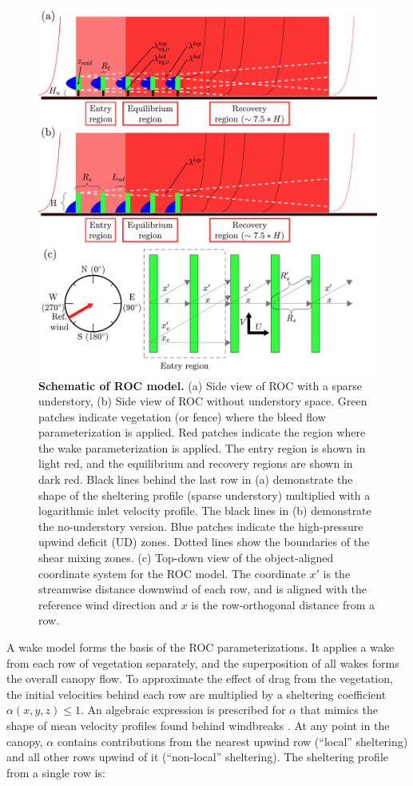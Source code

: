\begin{figure}[H]\label{fig:ROCmodel}
\includegraphics[width=17cm]{Images/ROC_model_schematic.png}
\caption{\textbf{Schematic of ROC model.} (a) Side view of ROC with a sparse understory, (b) Side view of ROC without understory space. Green patches indicate vegetation (or fence) where the bleed flow parameterization is applied. Red patches indicate the region where the wake parameterization is applied. The entry region is shown in light red, and the equilibrium and recovery regions are shown in dark red.  Black lines behind the last row in (a) demonstrate the shape of the sheltering profile (sparse understory) multiplied with a logarithmic inlet velocity profile. The black lines in (b) demonstrate the no-understory version. Blue patches indicate the high-pressure upwind deficit (UD) zones. Dotted lines show the boundaries of the shear mixing zones.
    (c) Top-down view of the object-aligned coordinate system for the ROC model. The coordinate $x'$ is the streamwise distance downwind of each row, and is aligned with the reference wind direction and $x$ is the row-orthogonal distance from a row.}
\end{figure}


A wake model forms the basis of the ROC parameterizations. It applies a wake from each row of vegetation separately, and the superposition of all wakes forms the overall canopy flow.
To approximate the effect of drag from the vegetation, the initial velocities behind each row are multiplied by a sheltering coefficient $\alpha(x,y,z) \leq 1$.
An algebraic expression is prescribed for $\alpha$ that mimics the shape of mean velocity profiles found behind windbreaks \cite{speckart2014method}. At any point in the canopy, $\alpha$ contains contributions from the nearest upwind row (``local'' sheltering) and all other rows upwind of it (``non-local'' sheltering).
The sheltering profile from a single row is:

